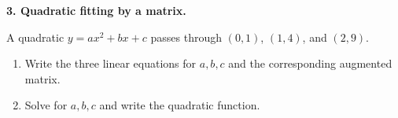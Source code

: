 \documentclass[11pt]{article}
\newcommand{\answerblank}[1]{\vspace{#1}}
\begin{document}
\textbf{3. Quadratic fitting by a matrix.}

A quadratic $y=ax^2+bx+c$ passes through $(0,1)$, $(1,4)$, and $(2,9)$.
\begin{enumerate}[label=(\alph*),leftmargin=0.35in]
\item Write the three linear equations for $a,b,c$ and the corresponding augmented matrix.
\answerblank{0.70in}
\item Solve for $a,b,c$ and write the quadratic function.
\answerblank{0.78in}
\end{enumerate}
\end{document}
